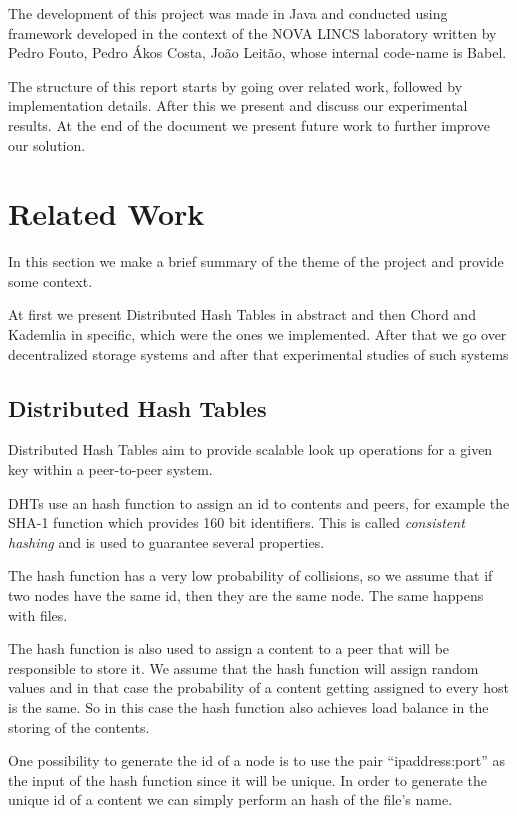 \documentclass[sigconf]{acmart}
\begin{document}
The development of this project was made in Java and conducted using framework developed in the context of the NOVA LINCS laboratory written by Pedro Fouto, Pedro Ákos Costa, João Leitão, whose internal code-name is Babel.

The structure of this report starts by going over related work, followed by implementation details. After this we present and discuss our experimental results. At the end of the document we present future work to further improve our solution.

\section{Related Work}
In this section we make a brief summary of the theme of the project and provide some context.

At first we present Distributed Hash Tables in abstract and then Chord and Kademlia in specific, which were the ones we implemented. After that we go over decentralized storage systems and after that experimental studies of such systems


\subsection{Distributed Hash Tables}
Distributed Hash Tables aim to provide scalable look up operations for a given key within a peer-to-peer system. 

DHTs use an hash function to assign an id to contents and peers, for example the SHA-1 function which provides 160 bit identifiers. This is called \emph{consistent hashing} and is used to guarantee several properties.

The hash function has a very low probability of collisions, so we assume that if two nodes have the same id, then they are the same node. The same happens with files.

The hash function is also used to assign a content to a peer that will be responsible to store it. We assume that the hash function will assign random values and in that case the probability of a content getting assigned to every host is the same. So in this case the hash function also achieves load balance in the storing of the contents.

One possibility to generate the id of a node is to use the pair ``ipaddress:port'' as the input of the hash function since it will be unique. In order to generate the unique id of a content we can simply perform an hash of the file's name.
\end{document}
